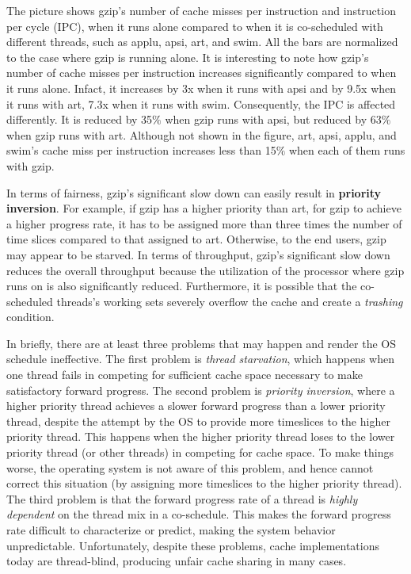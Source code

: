 The picture shows gzip's number of cache misses per instruction and instruction per cycle (IPC), when it runs alone compared to when it is
co-scheduled with different threads, such as applu, apsi, art, and swim. All the bars are normalized to the case where gzip is running alone.
It is interesting to note how gzip's number of cache misses per instruction increases significantly compared to when it runs alone. Infact, it increases 
by 3x when it runs with apsi and by 9.5x when it runs with art, 7.3x when it runs with swim.
Consequently, the IPC is affected differently. It is reduced by 35$\%$ when gzip runs with apsi, but reduced by 63$\%$ when gzip runs with art. 
Although not shown in the figure, art, apsi, applu, and swim's cache miss per instruction increases less than 15$\%$ when each of them runs with gzip. 

In terms of fairness, gzip's significant slow down can easily result in \textbf{priority inversion}. 
For example, if gzip has a higher priority than art, for gzip to achieve a higher progress rate, it has to be assigned more than three times the 
number of time slices compared to that assigned to art. Otherwise, to the end users, gzip may appear to be starved. In terms of throughput,
gzip's significant slow down reduces the overall throughput because the utilization of the processor where gzip runs on is also significantly reduced. 
Furthermore, it is possible that the co-scheduled threads's working sets severely overflow the cache and create a \textit{trashing} condition.

In briefly, there are at least three problems that may happen and render the OS schedule ineffective.
The first problem is \textit{thread starvation}, which happens when one thread fails in competing for sufficient cache space necessary to make 
satisfactory forward progress. The second problem is \textit{priority inversion}, where a higher priority thread achieves a slower forward
progress than a lower priority thread, despite the attempt by the OS to provide more timeslices to the higher priority thread.
This happens when the higher priority thread loses to the lower priority thread (or other threads) in competing for cache space. 
To make things worse, the operating system is not aware of this problem, and hence cannot correct this situation (by assigning more timeslices to the 
higher priority thread). The third problem is that the forward progress rate of a thread is \textit{highly dependent} on the thread mix in a co-schedule. 
This makes the forward progress rate difficult to characterize or predict, making the system behavior unpredictable. Unfortunately, despite these problems, 
cache implementations today are thread-blind, producing unfair cache sharing in many cases.

